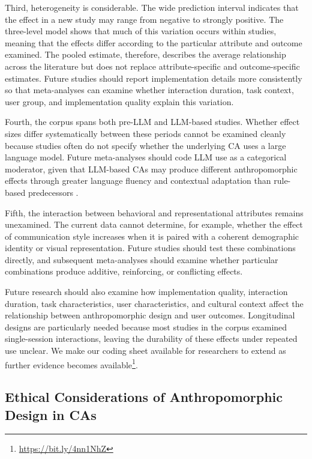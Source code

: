 \documentclass[preprint,review,12pt,authoryear,nonatbib]{elsarticle}
\begin{document}
Third, heterogeneity is considerable. The wide prediction interval indicates that the effect in a new study may range from negative to strongly positive. The three-level model shows that much of this variation occurs within studies, meaning that the effects differ according to the particular attribute and outcome examined. The pooled estimate, therefore, describes the average relationship across the literature but does not replace attribute-specific and outcome-specific estimates. Future studies should report implementation details more consistently so that meta-analyses can examine whether interaction duration, task context, user group, and implementation quality explain this variation.

Fourth, the corpus spans both pre-LLM and LLM-based studies. Whether effect sizes differ systematically between these periods cannot be examined cleanly because studies often do not specify whether the underlying CA uses a large language model. Future meta-analyses should code LLM use as a categorical moderator, given that LLM-based CAs may produce different anthropomorphic effects through greater language fluency and contextual adaptation than rule-based predecessors \parencite{amin2024chatgpt}.

Fifth, the interaction between behavioral and representational attributes remains unexamined. The current data cannot determine, for example, whether the effect of communication style increases when it is paired with a coherent demographic identity or visual representation. Future studies should test these combinations directly, and subsequent meta-analyses should examine whether particular combinations produce additive, reinforcing, or conflicting effects.

Future research should also examine how implementation quality, interaction duration, task characteristics, user characteristics, and cultural context affect the relationship between anthropomorphic design and user outcomes. Longitudinal designs are particularly needed because most studies in the corpus examined single-session interactions, leaving the durability of these effects under repeated use unclear. We make our coding sheet available for researchers to extend as further evidence becomes available\footnote{\href{https://osf.io/7rj6f/overview?view_only=35b327583fee4222b5b336465107580c}{https://bit.ly/4nn1NhZ}}.

\subsection{Ethical Considerations of Anthropomorphic Design in CAs}
\end{document}
